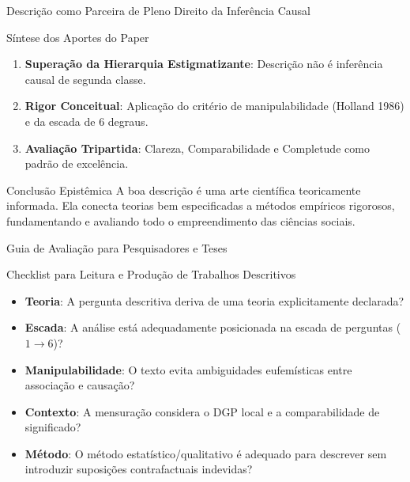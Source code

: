 \documentclass[
  ignorenonframetext,
  aspectratio=169,
  brazilian,
  t,
  10pt]{beamer}
\providecommand{\tightlist}{%
  \setlength{\itemsep}{0pt}\setlength{\parskip}{0pt}}
\begin{document}
\begin{frame}{Descrição como Parceira de Pleno Direito da Inferência
Causal}
\protect{}\label{descriuxe7uxe3o-como-parceira-de-pleno-direito-da-inferuxeancia-causal}
\begin{block}{Síntese dos Aportes do Paper}
\protect{}\label{suxedntese-dos-aportes-do-paper}
\begin{enumerate}
\tightlist
\item
  \textbf{Superação da Hierarquia Estigmatizante}: Descrição não é
  inferência causal de segunda classe.
\item
  \textbf{Rigor Conceitual}: Aplicação do critério de manipulabilidade
  (Holland 1986) e da escada de 6 degraus.
\item
  \textbf{Avaliação Tripartida}: Clareza, Comparabilidade e Completude
  como padrão de excelência.
\end{enumerate}

\begin{block}{Conclusão Epistêmica}
A boa descrição é uma arte científica teoricamente informada. Ela conecta teorias bem especificadas a métodos empíricos rigorosos, fundamentando e avaliando todo o empreendimento das ciências sociais.
\end{block}
\end{block}
\end{frame}

\begin{frame}{Guia de Avaliação para Pesquisadores e Teses}
\protect{}\label{guia-de-avaliauxe7uxe3o-para-pesquisadores-e-teses}
\begin{block}{Checklist para Leitura e Produção de Trabalhos
Descritivos}
\protect{}\label{checklist-para-leitura-e-produuxe7uxe3o-de-trabalhos-descritivos}
\begin{itemize}
\tightlist
\item[$\square$]
  \textbf{Teoria}: A pergunta descritiva deriva de uma teoria
  explicitamente declarada?
\item[$\square$]
  \textbf{Escada}: A análise está adequadamente posicionada na escada de
  perguntas (\(1 \to 6\))?
\item[$\square$]
  \textbf{Manipulabilidade}: O texto evita ambiguidades eufemísticas
  entre associação e causação?
\item[$\square$]
  \textbf{Contexto}: A mensuração considera o DGP local e a
  comparabilidade de significado?
\item[$\square$]
  \textbf{Método}: O método estatístico/qualitativo é adequado para
  descrever sem introduzir suposições contrafactuais indevidas?
\end{itemize}
\end{block}
\end{frame}
\end{document}
